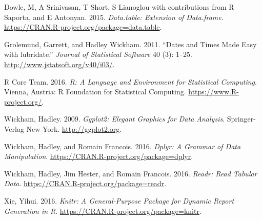 \documentclass[]{article}
\begin{document}
\hypertarget{ref-data.table}{}
Dowle, M, A Srinivasan, T Short, S Lianoglou with contributions from R
Saporta, and E Antonyan. 2015. \emph{Data.table: Extension of
Data.frame}. \url{https://CRAN.R-project.org/package=data.table}.

\hypertarget{ref-lubridate}{}
Grolemund, Garrett, and Hadley Wickham. 2011. ``Dates and Times Made
Easy with lubridate.'' \emph{Journal of Statistical Software} 40 (3):
1--25. \url{http://www.jstatsoft.org/v40/i03/}.

\hypertarget{ref-baseR}{}
R Core Team. 2016. \emph{R: A Language and Environment for Statistical
Computing}. Vienna, Austria: R Foundation for Statistical Computing.
\url{https://www.R-project.org/}.

\hypertarget{ref-ggplot2}{}
Wickham, Hadley. 2009. \emph{Ggplot2: Elegant Graphics for Data
Analysis}. Springer-Verlag New York. \url{http://ggplot2.org}.

\hypertarget{ref-dplyr}{}
Wickham, Hadley, and Romain Francois. 2016. \emph{Dplyr: A Grammar of
Data Manipulation}. \url{https://CRAN.R-project.org/package=dplyr}.

\hypertarget{ref-readr}{}
Wickham, Hadley, Jim Hester, and Romain Francois. 2016. \emph{Readr:
Read Tabular Data}. \url{https://CRAN.R-project.org/package=readr}.

\hypertarget{ref-knitr}{}
Xie, Yihui. 2016. \emph{Knitr: A General-Purpose Package for Dynamic
Report Generation in R}. \url{https://CRAN.R-project.org/package=knitr}.
\end{document}
